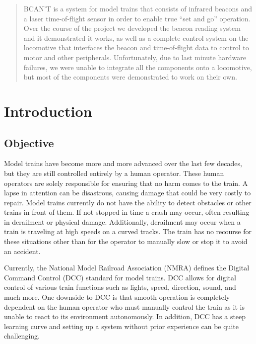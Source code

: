 \documentclass[openbib,letterpaper,10pt]{article}
\newcommand{\abstractsetting}{
	\pagenumbering{roman}
	\thispagestyle{fancy}
}
\newcommand{\buildtoc}{
	\clearpage
	\singlespacing
	\tableofcontents
	\clearpage
	\onehalfspacing
	\setcounter{page}{1}
	\pagenumbering{arabic}
}
\begin{document}
\maketitle
\pagestyle{fancy}
\begin{spacing}{1.15}

\begin{abstract}
BCAN’T is a system for model trains that consists of infrared beacons and a laser time-of-flight sensor in order to enable true “set and go” operation. Over the course of the project we developed the beacon reading system and it demonstrated it works, as well as a complete control system on the locomotive that interfaces the beacon and time-of-flight data to control to motor and other peripherals. Unfortunately, due to last minute hardware failures, we were unable to integrate all the components onto a locomotive, but most of the components were demonstrated to work on their own.
\abstractsetting %
\end{abstract}

\buildtoc


\section{Introduction}
\subsection{Objective}
Model trains have become more and more advanced over the last few decades, but they are still controlled entirely by a human operator. These human operators are solely responsible for ensuring that no harm comes to the train. A lapse in attention can be disastrous, causing damage that could be very costly to repair. Model trains currently do not have the ability to detect obstacles or other trains in front of them. If not stopped in time a crash may occur, often resulting in derailment or physical damage. Additionally, derailment may occur when a train is traveling at high speeds on a curved tracks. The train has no recourse for these situations other than for the operator to manually slow or stop it to avoid an accident.\par

Currently, the National Model Railroad Association (NMRA) defines the Digital Command Control (DCC) standard for model trains. DCC allows for digital control of various train functions such as lights, speed, direction, sound, and much more\cite{NMRA_DCC}. One downside to DCC is that smooth operation is completely dependent on the human operator who must manually control the train as it is unable to react to its environment autonomously. In addition, DCC has a steep learning curve and setting up a system without prior experience can be quite challenging.\par


\end{spacing}
\end{document}
